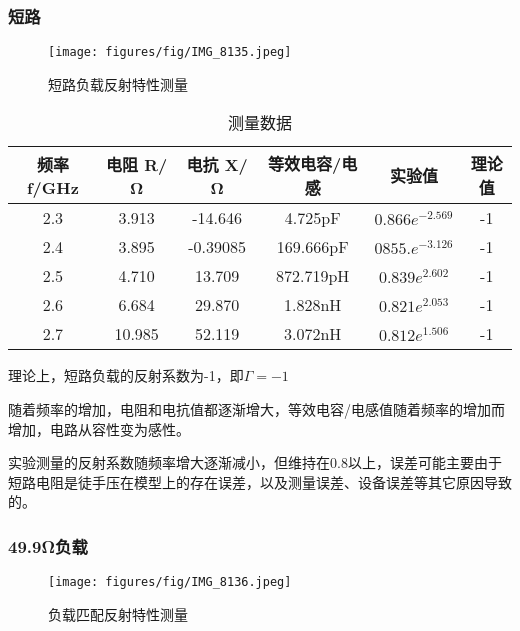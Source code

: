\documentclass[12pt,hyperref,a4paper,UTF8]{ctexart}
\begin{document}
\subsubsection{短路}
\begin{figure}[H]
    \centering
    \texttt{[image: figures/fig/IMG\_8135.jpeg]}
    \caption{短路负载反射特性测量}
    \label{fig:enter-label}
\end{figure}

\begin{table}[h]
    \centering
    \begin{tabular}{cccccc}
    \hline
    频率 f/GHz & 电阻 R/Ω & 电抗 X/Ω & 等效电容/电感 & 实验值 & 理论值 \\
    \hline
    2.3 & 3.913 & -14.646 & 4.725pF & $0.866e^{-2.569}$ & -1 \\
    2.4 & 3.895 & -0.39085 & 169.666pF & $0855.e^{-3.126}$ & -1 \\
    2.5 & 4.710 & 13.709 & 872.719pH & $0.839e^{2.602}$ & -1 \\
    2.6 & 6.684 & 29.870 & 1.828nH & $0.821e^{2.053}$ & -1 \\
    2.7 & 10.985 & 52.119 & 3.072nH & $0.812e^{1.506}$ & -1 \\
    \hline
    \end{tabular}
    \caption{测量数据}
    \label{tab:my_label}
    \end{table}

理论上，短路负载的反射系数为-1，即$\Gamma = -1$

随着频率的增加，电阻和电抗值都逐渐增大，等效电容/电感值随着频率的增加而增加，电路从容性变为感性。

实验测量的反射系数随频率增大逐渐减小，但维持在0.8以上，误差可能主要由于短路电阻是徒手压在模型上的存在误差，以及测量误差、设备误差等其它原因导致的。


\subsubsection{49.9Ω负载}
    \begin{figure}[H]
        \centering
        \texttt{[image: figures/fig/IMG\_8136.jpeg]}
        \caption{负载匹配反射特性测量}
        \label{fig:enter-label}
    \end{figure}
    
\end{document}
